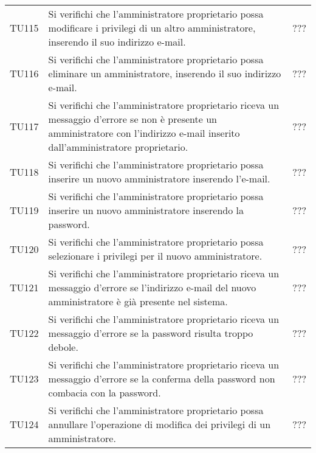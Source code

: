 {\begin{longtable}{ c  C{9cm} C{1cm}}
TU115 & Si verifichi che l’amministratore proprietario possa modificare i privilegi di un altro amministratore, inserendo il suo indirizzo e-mail. & ??? \\
TU116 & Si verifichi che l’amministratore proprietario possa eliminare un amministratore, inserendo il suo indirizzo e-mail. & ??? \\
TU117 & Si verifichi che l’amministratore proprietario riceva un messaggio d'errore se non è presente un amministratore con l'indirizzo e-mail inserito dall'amministratore proprietario. & ??? \\
TU118 & Si verifichi che l’amministratore proprietario possa inserire un nuovo amministratore inserendo l’e-mail. & ??? \\
TU119 & Si verifichi che l’amministratore proprietario possa inserire un nuovo amministratore inserendo la password. & ??? \\
TU120 & Si verifichi che l’amministratore proprietario possa selezionare i privilegi per il nuovo amministratore. & ??? \\
TU121 & Si verifichi che l’amministratore proprietario riceva un messaggio d'errore se l'indirizzo e-mail del nuovo amministratore è già presente nel sistema. & ??? \\
TU122 & Si verifichi che l’amministratore proprietario riceva un messaggio d'errore se la password risulta troppo debole. & ??? \\
TU123 & Si verifichi che l’amministratore proprietario riceva un messaggio d'errore se la conferma della password non combacia con la password. & ??? \\
TU124 & Si verifichi che l’amministratore proprietario possa annullare l'operazione di modifica dei privilegi di un amministratore.  & ??? \\
\end{longtable}
}